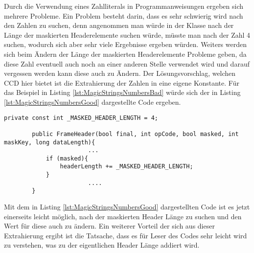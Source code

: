 \SuperPar Durch die Verwendung eines Zahlliterals in Programmanweisungen ergeben sich mehrere Probleme. Ein Problem besteht darin, dass es sehr schwierig wird nach den Zahlen zu suchen, denn angenommen man würde in der Klasse nach der Länge der maskierten Headerelemente suchen würde, müsste man nach der Zahl 4 suchen, wodurch sich aber sehr viele Ergebnisse ergeben würden. Weiters werden sich beim Ändern der Länge der maskierten Headerelemente Probleme geben, da diese Zahl eventuell auch noch an einer anderen Stelle verwendet wird und darauf vergessen werden kann diese auch zu Ändern. Der Lösungsvorschlag, welchen CCD hier bietet ist die Extrahierung der Zahlen in eine eigene Konstante. Für das Beispiel in Listing \ref{lst:MagicStringsNumbersBad}  würde sich der in Listing \ref{lst:MagicStringsNumbersGood} dargestellte Code ergeben.

\begin{lstlisting}[language={[Sharp]C}, caption=Magic number, label=lst:MagicStringsNumbersGood]
				private const int _MASKED_HEADER_LENGTH = 4;
	
        public FrameHeader(bool final, int opCode, bool masked, int maskKey, long dataLength){
						...
            if (masked){
                headerLength += _MASKED_HEADER_LENGTH;
            }
						....
        }
\end{lstlisting}

\SuperPar Mit dem in Listing \ref{lst:MagicStringsNumbersGood} dargestellten Code ist es jetzt einerseits leicht möglich, nach der maskierten Header Länge zu suchen und den Wert für diese auch zu ändern. Ein weiterer Vorteil der sich aus dieser Extrahierung ergibt ist die Tatsache, dass es für Leser des Codes sehr leicht wird zu verstehen, was zu der eigentlichen Header Länge addiert wird. 



